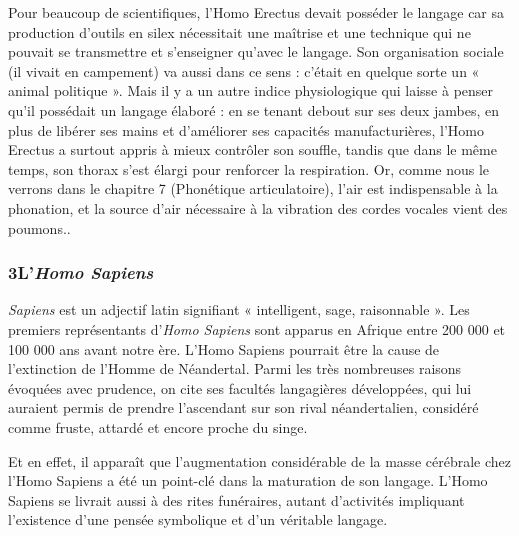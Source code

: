 Pour beaucoup de scientifiques, l’Homo Erectus devait posséder le langage car sa production d’outils en silex nécessitait une maîtrise et une technique qui ne pouvait se transmettre et s’enseigner qu’avec le langage. Son organisation sociale (il vivait en campement) va aussi dans ce sens : c’était en quelque sorte un « animal politique ». Mais il y a un autre indice physiologique qui laisse à penser qu’il possédait un langage élaboré : en se tenant debout sur ses deux jambes, en plus de libérer ses mains et d’améliorer ses capacités manufacturières, l’Homo Erectus a surtout appris à mieux contrôler son souffle, tandis que dans le même temps, son thorax s’est élargi pour renforcer la respiration. Or, comme nous le verrons dans le chapitre 7 (Phonétique articulatoire), l’air est indispensable à la phonation, et la source d’air nécessaire à la vibration des cordes vocales vient des poumons..
\subsubsection*{3\quad L’\textit{Homo Sapiens}}
\textit{Sapiens} est un adjectif latin signifiant « intelligent, sage, raisonnable ». Les premiers représentants d’\textit{Homo Sapiens} sont apparus en Afrique entre 200 000 et 100 000 ans avant notre ère. L’Homo Sapiens pourrait être la cause de l’extinction de l’Homme de Néandertal. Parmi les très nombreuses raisons évoquées avec prudence, on cite ses facultés langagières développées, qui lui auraient permis de prendre l’ascendant sur son rival néandertalien, considéré comme fruste, attardé et encore proche du singe.

Et en effet, il apparaît que l’augmentation considérable de la masse cérébrale chez l’Homo Sapiens a été un point-clé dans la maturation de son langage. L’Homo Sapiens se livrait aussi à des rites funéraires, autant d’activités impliquant l’existence d’une pensée symbolique et d’un véritable langage.

